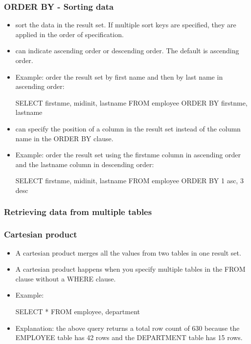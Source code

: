 \documentclass{article}
\begin{document}
\subsubsection{ORDER BY - Sorting data}
\begin{itemize}
\item sort the data in the result set. If multiple sort keys are specified, they are applied in the
order of specification.
\item can indicate ascending order or descending order. The default is ascending order.
\item Example: order the result set by first name and then by last name in ascending order:
\begin{sqlcode}
SELECT firstnme, midinit, lastname FROM employee ORDER BY firstnme, lastname
\end{sqlcode}
\item can specify the position of a column in the result set instead of the column name in the ORDER BY clause.
\item Example: order the result set using the firstnme column in ascending order and the lastname column
in descending order:
\begin{sqlcode}
SELECT firstnme, midinit, lastname FROM employee ORDER BY 1 asc, 3 desc
\end{sqlcode}
\end{itemize}

\subsubsection{Retrieving data from multiple tables}
\subsubsection*{Cartesian product}
\begin{itemize}
\item A cartesian product merges all the values from two tables in one result set. 
\item A cartesian product happens when you specify multiple tables in the FROM clause without a WHERE
clause.
\item Example: 
\begin{sqlcode}
SELECT * FROM employee, department
\end{sqlcode}
\item Explanation: the above query returns a total row count of 630 because the EMPLOYEE table has 42 rows 
and the DEPARTMENT table has 15 rows.
\end{itemize}
\end{document}
